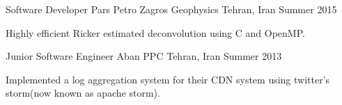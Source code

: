 \begin{cventries}
  \cventry
    {Software Developer} %
    {Pars Petro Zagros Geophysics} %
    {Tehran, Iran} %
    {Summer 2015} %
    {
      \begin{cvitems} %
        \item {Highly efficient Ricker estimated deconvolution using C and OpenMP.}
      \end{cvitems}
    }

  \cventry
    {Junior Software Engineer} %
    {Aban PPC} %
    {Tehran, Iran} %
    {Summer 2013} %
    {
      \begin{cvitems} %
        \item {Implemented a log aggregation system for their CDN system using twitter's storm(now known as apache storm).}
      \end{cvitems}
    }

\end{cventries}

